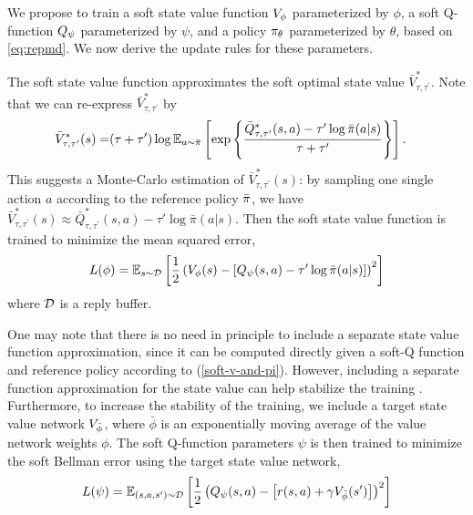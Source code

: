 
We propose to train a soft state value function $V_{\phi}$ parameterized by $\phi$, a soft Q-function $Q_{\psi}$ parameterized by $\psi$, and a policy $\pi_{\theta}$ parameterized by $\theta$, based on \cref{eq:repmd}. We now derive the update rules for these parameters. 

The soft state value function approximates the soft optimal state value $\bar{V}_{\tau,\tau^{\prime}}^*$. Note that we can re-express $\bar{V}_{\tau,\tau^{\prime}}^*$ by 
\begin{align*}
\bar{V}_{\tau,\tau^{\prime}}^*(s) 
= & (\tau + \tau') \log \mathbb{E} _ {a\sim \bar{\pi}} \left[ \exp \left\{ \frac{\bar{Q}_{\tau,\tau^{\prime}}^*(s,a) - \tau' \log \bar{\pi}(a|s)} {\tau + \tau'} \right\} \right].
\end{align*}
This suggests a Monte-Carlo estimation of $\bar{V}_{\tau,\tau^{\prime}}^*(s)$: by sampling one single action $a$ according to the reference policy $\bar{\pi}$, we have $\bar{V}_{\tau,\tau^{\prime}}^*(s) \approx  \bar{Q}_{\tau,\tau^{\prime}}^*(s,a) - \tau' \log \bar{\pi}(a|s) $. Then the soft state value function is trained to minimize the mean squared error,
\begin{equation}
\label{eq:trainV}
L (\phi) = \mathbb{E}_{s\sim {\mathcal{D}}} \left[ \frac{1}{2} \left( V_{\phi}(s) -  \left[ Q_{\psi}(s,a ) - \tau' \log \bar{\pi}(a|s) \right] \right)^2 \right]
\end{equation}
where ${\mathcal{D}}$ is a reply buffer. 

One may note that there is no need in principle to include a separate state value function approximation, since it can be computed directly given a soft-Q function and reference policy according to (\ref{soft-v-and-pi}). However, including a separate function approximation for the state value can help stabilize the training \citep{haarnoja2018soft}. 
Furthermore, to increase the stability of the training, we include a target state value network $V_{\bar{\phi}}$, where $\bar{\phi}$ is an exponentially moving average of the value network weights $\phi$. 
The soft Q-function parameters $\psi$ is then trained to minimize the soft Bellman error using the target state value network,
\begin{equation}
\label{eq:trainQ}
L(\psi) = \mathbb{E}_{(s,a,s') \sim {\mathcal{D}}} \left[ \frac{1}{2} \left( Q_{\psi}(s,a) - \left[r(s,a) + \gamma V_{\bar{\phi}}(s') \right] \right)^2 \right]
\end{equation}

